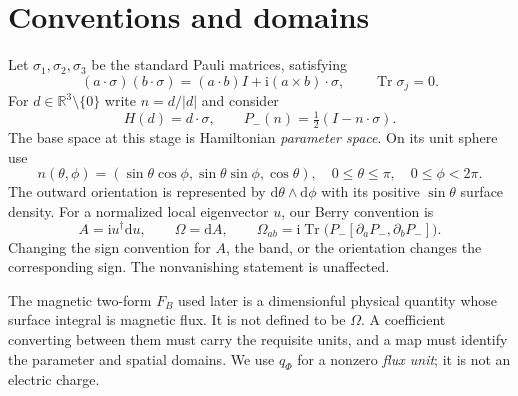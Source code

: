 \documentclass[11pt]{article}
\theoremstyle{definition}\newtheorem{definition}[theorem]{Definition}
\theoremstyle{remark}\newtheorem{remark}[theorem]{Remark}
\newcommand{\Tr}{\operatorname{Tr}}
\newcommand{\ii}{\mathrm{i}}
\newcommand{\dd}{\mathrm{d}}
\newcommand{\R}{\mathbb{R}}
\begin{document}
\section{Conventions and domains}
Let $\sigma_1,\sigma_2,\sigma_3$ be the standard Pauli matrices, satisfying
\hypertarget{eq:pauli}{}
\begin{equation}
 (a\cdot\sigma)(b\cdot\sigma)=(a\cdot b)I+\ii(a\times b)\cdot\sigma,
 \qquad \Tr\sigma_j=0.
\end{equation}
For $d\in\R^3\setminus\{0\}$ write $n=d/|d|$ and consider
\hypertarget{eq:h}{}
\begin{equation}
 H(d)=d\cdot\sigma,\qquad P_-(n)=\tfrac12(I-n\cdot\sigma).
\end{equation}
The base space at this stage is Hamiltonian \emph{parameter space}. On its unit sphere use
\hypertarget{eq:n}{}
\begin{equation}
 n(\theta,\phi)=(\sin\theta\cos\phi,\sin\theta\sin\phi,\cos\theta),
 \quad 0\leq\theta\leq\pi,\quad 0\leq\phi<2\pi.
\end{equation}
The outward orientation is represented by $\dd\theta\wedge\dd\phi$ with its positive $\sin\theta$ surface density. For a normalized local eigenvector $u$, our Berry convention is
\hypertarget{eq:berryconv}{}
\begin{equation}
 A=\ii u^\dagger\dd u,\qquad \Omega=\dd A,
 \qquad \Omega_{ab}=\ii\Tr\bigl(P_-[\partial_aP_-,\partial_bP_-]\bigr).
\end{equation}
Changing the sign convention for $A$, the band, or the orientation changes the corresponding sign. The nonvanishing statement is unaffected.

The magnetic two-form $F_B$ used later is a dimensionful physical quantity whose surface integral is magnetic flux. It is not defined to be $\Omega$. A coefficient converting between them must carry the requisite units, and a map must identify the parameter and spatial domains. We use $q_\Phi$ for a nonzero \emph{flux unit}; it is not an electric charge.
\end{document}
